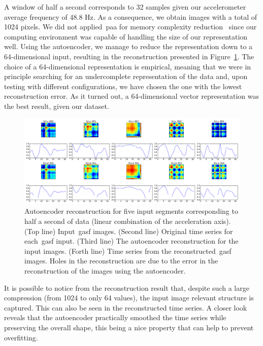 A window of half a second corresponds to 32 samples given our accelerometer average frequency of 48.8 Hz. As a consequence, we obtain images with a total of 1024 pixels. We did not applied~\gls{paa} for memory complexity reduction~\citep{wang_time_2016} since our computing environment was capable of handling the size of our representation well. Using the autoencoder, we manage to reduce the representation down to a 64-dimensional input, resulting in the reconstruction presented in Figure~\ref{fig:reconstruction}. The choice of a 64-dimensional representation is empirical, meaning that we were in principle searching for an undercomplete representation of the data and, upon testing with different configurations, we have chosen the one with the lowest reconstruction error. As it turned out, a 64-dimensional vector representation was the best result, given our dataset. 

\begin{figure}[h]
	\centering
	\includegraphics[width=\textwidth]{images/05-modeling/reconstructions}
	\caption{Autoencoder reconstruction for five input segments corresponding to half a second of data (linear combination of the acceleration axis). ({Top line}) Input~\gls{gasf} images. ({Second line}) Original time series for each~\gls{gasf} input. ({Third line}) The autoencoder reconstruction for the input images. ({Forth line}) Time series from the reconstructed~\gls{gasf} images. Holes in the reconstruction are due to the error in the reconstruction of the images using the autoencoder.}
  \label{fig:reconstruction}
\end{figure}

It is possible to notice from the reconstruction result that, despite such a large compression (from 1024 to only 64 values), the input image relevant structure is captured. This can also be seen in the reconstructed time series. A closer look reveals that the autoencoder practically smoothed the time series while preserving the overall shape, this being a nice property that can help to prevent overfitting.

